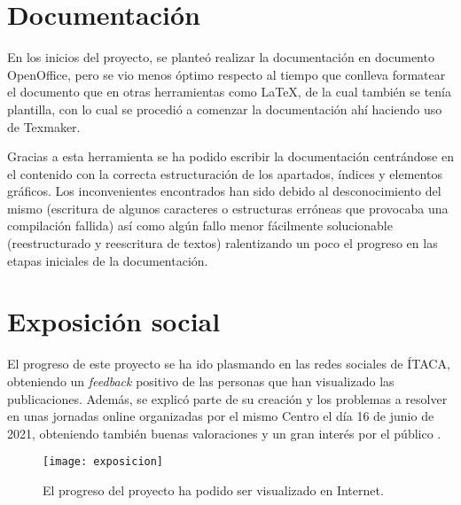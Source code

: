 \section{Documentación}

En los inicios del proyecto, se planteó realizar la documentación en documento OpenOffice, pero se vio menos óptimo respecto al tiempo que conlleva formatear el documento que en otras herramientas como LaTeX, de la cual también se tenía plantilla, con lo cual se procedió a comenzar la documentación ahí haciendo uso de Texmaker.

Gracias a esta herramienta se ha podido escribir la documentación centrándose en el contenido con la correcta estructuración de los apartados, índices y elementos gráficos. Los inconvenientes encontrados han sido debido al desconocimiento del mismo (escritura de algunos caracteres o estructuras erróneas que provocaba una compilación fallida) así como algún fallo menor fácilmente solucionable (reestructurado y reescritura de textos) ralentizando un poco el progreso en las etapas iniciales de la documentación.

\section{Exposición social}

El progreso de este proyecto se ha ido plasmando en las redes sociales de ÍTACA, obteniendo un \textit{feedback} positivo de las personas que han visualizado las publicaciones. Además, se explicó parte de su creación y los problemas a resolver en unas jornadas online organizadas por el mismo Centro el día 16 de junio de 2021, obteniendo también buenas valoraciones y un gran interés por el público \cite{itaca:jornadas}.

\begin{figure}[h]
	\centering
	\texttt{[image: exposicion]}
	\caption{El progreso del proyecto ha podido ser visualizado en Internet.}
	\label{fig:exposicion}
\end{figure}